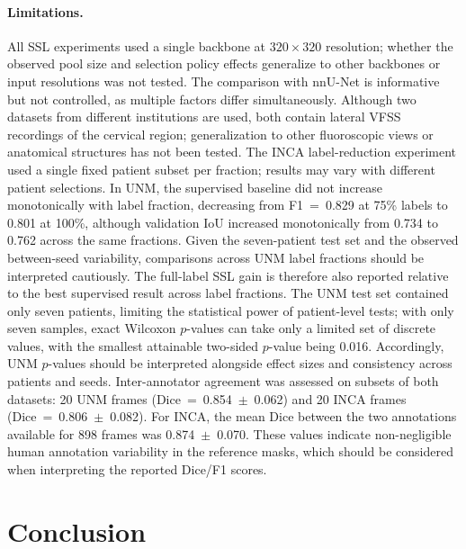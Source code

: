 \documentclass[a4paper,fleqn]{cas-dc}
\begin{document}
\paragraph{Limitations.}
All SSL experiments used a single backbone at $320{\times}320$ resolution; whether the observed pool size and selection policy effects generalize to other backbones or input resolutions was not tested.
The comparison with nnU-Net is informative but not controlled, as multiple factors differ simultaneously.
Although two datasets from different institutions are used, both contain lateral VFSS recordings of the cervical region; generalization to other fluoroscopic views or anatomical structures has not been tested.
The INCA label-reduction experiment used a single fixed patient subset per fraction; results may vary with different patient selections.
In UNM, the supervised baseline did not increase monotonically with label fraction, decreasing from F1~=~0.829 at 75\% labels to 0.801 at 100\%, although validation IoU increased monotonically from 0.734 to 0.762 across the same fractions. Given the seven-patient test set and the observed between-seed variability, comparisons across UNM label fractions should be interpreted cautiously. The full-label SSL gain is therefore also reported relative to the best supervised result across label fractions.
The UNM test set contained only seven patients, limiting the statistical power of patient-level tests; with only seven samples, exact Wilcoxon $p$-values can take only a limited set of discrete values, with the smallest attainable two-sided $p$-value being 0.016. Accordingly, UNM $p$-values should be interpreted alongside effect sizes and consistency across patients and seeds.
Inter-annotator agreement was assessed on subsets of both datasets: 20 UNM frames (Dice~=~0.854~$\pm$~0.062) and 20 INCA frames (Dice~=~0.806~$\pm$~0.082). For INCA, the mean Dice between the two annotations available for 898 frames was 0.874~$\pm$~0.070. These values indicate non-negligible human annotation variability in the reference masks, which should be considered when interpreting the reported Dice/F1 scores.

\section{Conclusion}
\label{sec:conclusion}
\end{document}
